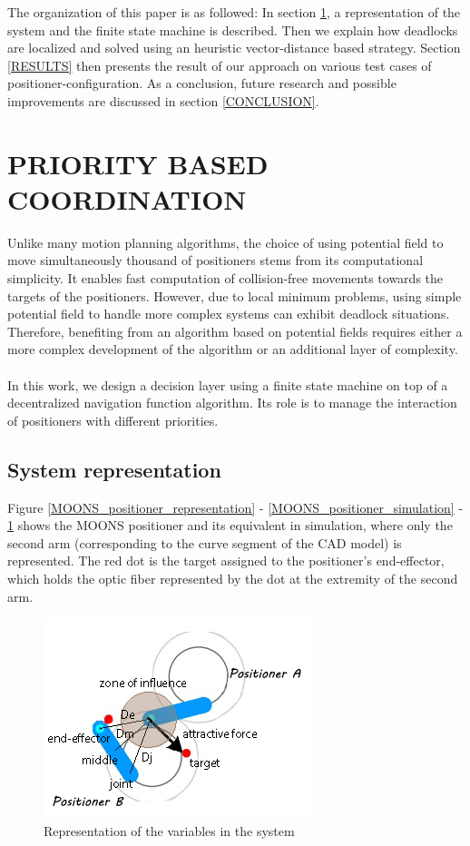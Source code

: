 \documentclass[]{spie}  %
\begin{document}
	The organization of this paper is as followed: In section \ref{PRIORITY BASED COORDINATION}, a representation of the system and the finite state machine is described. Then we explain how deadlocks are localized and solved using an heuristic vector-distance based strategy. Section \ref{RESULTS} then presents the result of our approach on various test cases of positioner-configuration. As a conclusion, future research and possible improvements are discussed in section \ref{CONCLUSION}.
	
	\section{PRIORITY BASED COORDINATION}
	\label{PRIORITY BASED COORDINATION}
	
	
	Unlike many motion planning algorithms, the choice of using potential field to move simultaneously thousand of positioners stems from its computational simplicity. It enables fast computation of collision-free movements towards the targets of the positioners. However, due to local minimum problems, using simple potential field to handle more complex systems can exhibit deadlock situations. Therefore, benefiting from an algorithm based on potential fields requires either a more complex development of the algorithm or an additional layer of complexity.\\\\
	In this work, we design a decision layer using a finite state machine on top of a decentralized navigation function algorithm. Its role is to manage the interaction of positioners with different priorities. 

	\subsection{System representation}	
		\label{Finite-state machine} 
	
	 Figure \ref{MOONS_positioner_representation} - \ref{MOONS_positioner_simulation} - \ref{sys_representation} shows the MOONS positioner and its equivalent in simulation, where only the second arm (corresponding to the curve segment of the CAD model) is represented. The red dot is the target assigned to the positioner's end-effector, which holds the optic fiber represented by the dot at the extremity of the second arm.
		\begin{figure}[H]
			\centering
			\includegraphics[scale=0.56]{images/system_representation.jpg}
			\caption{Representation of the variables in the system}
			\label{sys_representation}
		\end{figure}
	
\end{document}
